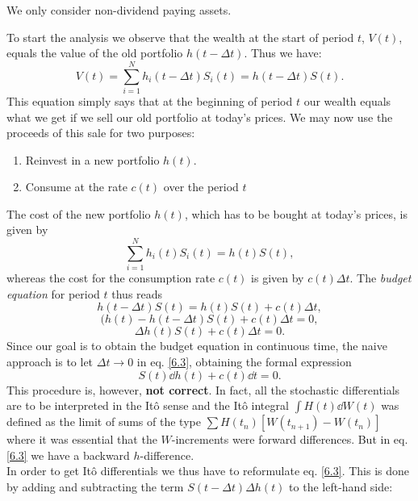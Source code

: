 \begin{remark}
    We only consider non-dividend paying assets.
\end{remark}
To start the analysis we observe that the wealth at the
start of period $t$, $V(t)$, equals the value of the old portfolio $h(t - \Delta t)$. Thus we have:
\begin{equation}\label{6.1}
    V(t) = \sum^N_{i=1}h_i(t-\Delta t)S_i(t) = h(t-\Delta t)S(t).
\end{equation}
This equation simply says that at the beginning of period $t$ our wealth equals what we get if we sell our old portfolio at today's
prices. We may now use the proceeds of this sale for two purposes:
\begin{enumerate}
    \item Reinvest in a new portfolio $h(t)$.
    \item Consume at the rate $c(t)$ over the period $t$
\end{enumerate}
The cost of the new portfolio $h(t)$, which has to be bought at today’s prices, is given by
\begin{equation}
    \sum^N_{i=1} h_i(t)S_i(t) = h(t)S(t),
\end{equation}
whereas the cost for the consumption rate $c(t)$ is given by $c(t)\Delta t$. The \emph{budget equation} for period $t$ thus reads
\begin{equation}
    h(t-\Delta t)S(t) = h(t)S(t) + c(t)\Delta t,
\end{equation}
\begin{equation*}
    (h(t)-h(t-\Delta t)S(t) + c(t)\Delta t = 0,
\end{equation*}
\begin{equation}\label{6.3}
    \Delta h(t)S(t) + c(t)\Delta t = 0.
\end{equation}
Since our goal is to obtain the budget equation in continuous time, the naive approach is to let $\Delta t \to 0$ in eq. \eqref{6.3}, obtaining the formal expression
\begin{equation}
    S(t)\dd h(t) + c(t)\dd t = 0.
\end{equation}
This procedure is, however, \textbf{not correct}. In fact, all the stochastic differentials are to be interpreted in the Itô sense and the Itô integral $\int H(t)\dd W(t)$ was defined as the limit of sums of the type $\sum H(t_n)[W(t_{n+1})-W(t_n)]$ where it was essential that the $W$-increments were forward differences. But in eq. \eqref{6.3} we have a backward $h$-difference.\\
In order to get Itô differentials we thus have to reformulate eq. \eqref{6.3}. This is done by adding and subtracting the term $S(t- \Delta t)\Delta h(t)$ to the left-hand side:
